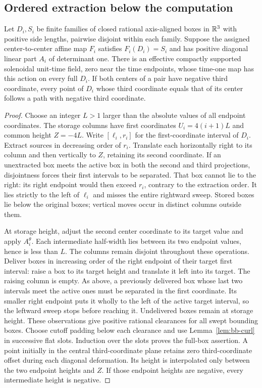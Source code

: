 \subsection{Ordered extraction below the computation}\label{bc:ordered-section}
\begin{proposition}\label{bc:ordered}
Let $D_i,S_i$ be finite families of closed rational axis-aligned boxes in $\mathbb R^3$
with positive side lengths, pairwise disjoint within each family.
Suppose the assigned center-to-center affine map $F_i$ satisfies
$F_i(D_i)=S_i$ and has positive diagonal linear part $A_i$ of
determinant one. There is an effective compactly supported solenoidal
unit-time field, zero near the time endpoints, whose time-one map has
this action on every full $D_i$. If both centers of a pair have negative
third coordinate, every point of $D_i$ whose third coordinate equals that
of its center follows a path with negative third coordinate.
\end{proposition}
\begin{proof}\label{bc:ordered-proof}
Choose an integer $L>1$ larger than the absolute values of all endpoint
coordinates. The storage columns have first coordinates $U_i=4(i+1)L$
and common height $Z=-4L$. Write $[\ell_i,r_i]$ for the first-coordinate
interval of $D_i$. Extract sources in decreasing order of $r_i$.
Translate each horizontally right to its column and then vertically to
$Z$, retaining its second coordinate. If an unextracted box meets the
active box in both the second and third projections, disjointness forces
their first intervals to be separated. That box cannot lie to the right:
its right endpoint would then exceed $r_i$, contrary to the extraction
order. It lies strictly to the left of $\ell_i$ and misses the entire
rightward sweep. Stored boxes lie below the original boxes; vertical
moves occur in distinct columns outside them.

At storage height, adjust the second center coordinate to its target
value and apply $A_i^{\theta}$. Each intermediate half-width lies between
its two endpoint values, hence is less than $L$. The columns remain
disjoint throughout these operations. Deliver boxes in increasing order
of the right endpoint of their target first interval: raise a box to its
target height and translate it left into its target. The raising column
is empty. As above, a previously delivered box whose last two intervals
meet the active ones must be separated in the first coordinate. Its
smaller right endpoint puts it wholly to the left of the active target
interval, so the leftward sweep stops before reaching it.
Undelivered boxes remain at storage height. These observations give
positive rational clearances for all swept bounding boxes. Choose cutoff
padding below each clearance and use Lemma~\ref{lem:bb-curl} in successive
flat slots. Induction over the slots proves the full-box assertion.
A point initially in the central third-coordinate plane retains zero
third-coordinate offset during each diagonal deformation. Its height is
interpolated only between the two endpoint heights and $Z$. If those
endpoint heights are negative, every intermediate height is negative.
\end{proof}

